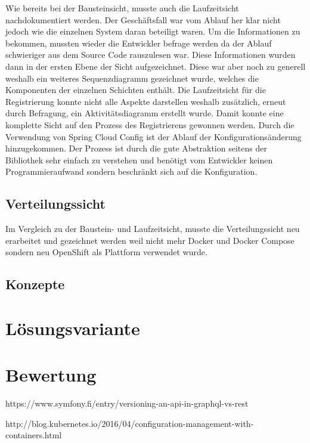 Wie bereits bei der Bausteinsicht, musste auch die Laufzeitsicht nachdokumentiert werden. Der Geschäftsfall war vom Ablauf her klar nicht jedoch wie die einzelnen System daran beteiligt waren. Um die Informationen zu bekommen, mussten wieder die Entwickler befrage werden da der Ablauf schwieriger aus dem Source Code rauszulesen war. Diese Informationen wurden dann in der ersten Ebene der Sicht aufgezeichnet. Diese war aber noch zu generell weshalb ein weiteres Sequenzdiagramm gezeichnet wurde, welches die Komponenten der einzelnen Schichten enthält. Die Laufzeitsicht für die Registrierung konnte nicht alle Aspekte darstellen weshalb zusätzlich, erneut durch Befragung, ein Aktivitätsdiagramm erstellt wurde. Damit konnte eine komplette Sicht auf den Prozess des Registrierens gewonnen werden.\newline\newline
Durch die Verwendung von Spring Cloud Config ist der Ablauf der Konfigurationsänderung hinzugekommen. Der Prozess ist durch die gute Abstraktion seitens der Bibliothek sehr einfach zu verstehen und benötigt vom Entwickler keinen Programmieraufwand sondern beschränkt sich auf die Konfiguration.

\subsection{Verteilungssicht}

Im Vergleich zu der Baustein- und Laufzeitsicht, musste die Verteilungssicht neu erarbeitet und gezeichnet werden weil nicht mehr Docker und Docker Compose sondern neu OpenShift als Plattform verwendet wurde.

\subsection{Konzepte}

\section{Lösungsvariante}


\section{Bewertung}

https://www.symfony.fi/entry/versioning-an-api-in-graphql-vs-rest

http://blog.kubernetes.io/2016/04/configuration-management-with-containers.html

